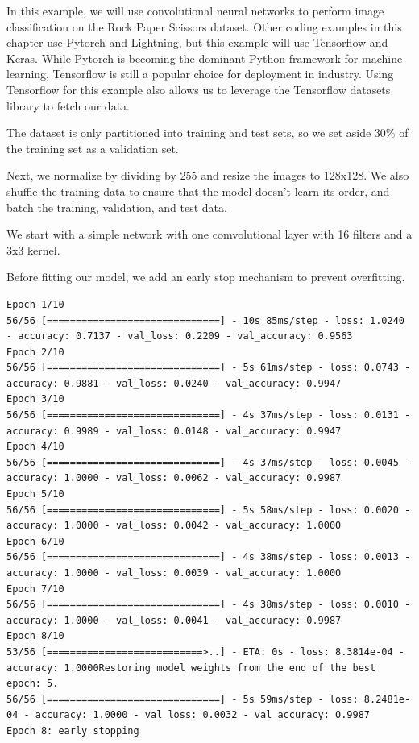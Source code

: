 \documentclass{article}
\begin{document}
In this example, we will use convolutional neural networks to perform image classification on the Rock Paper Scissors dataset. Other coding examples in this chapter use Pytorch and Lightning, but this example will use Tensorflow and Keras. While Pytorch is becoming the dominant Python framework for machine learning, Tensorflow is still a popular choice for deployment in industry. Using Tensorflow for this example also allows us to leverage the Tensorflow datasets library to fetch our data.



The dataset is only partitioned into training and test sets, so we set aside 30\% of the training set as a validation set.



Next, we normalize by dividing by 255 and resize the images to 128x128. We also shuffle the training data to ensure that the model doesn't learn its order, and batch the training, validation, and test data.



We start with a simple network with one comvolutional layer with 16 filters and a 3x3 kernel.



Before fitting our model, we add an early stop mechanism to prevent overfitting.



\begin{lstlisting}[style=output]
Epoch 1/10
56/56 [==============================] - 10s 85ms/step - loss: 1.0240 - accuracy: 0.7137 - val_loss: 0.2209 - val_accuracy: 0.9563
Epoch 2/10
56/56 [==============================] - 5s 61ms/step - loss: 0.0743 - accuracy: 0.9881 - val_loss: 0.0240 - val_accuracy: 0.9947
Epoch 3/10
56/56 [==============================] - 4s 37ms/step - loss: 0.0131 - accuracy: 0.9989 - val_loss: 0.0148 - val_accuracy: 0.9947
Epoch 4/10
56/56 [==============================] - 4s 37ms/step - loss: 0.0045 - accuracy: 1.0000 - val_loss: 0.0062 - val_accuracy: 0.9987
Epoch 5/10
56/56 [==============================] - 5s 58ms/step - loss: 0.0020 - accuracy: 1.0000 - val_loss: 0.0042 - val_accuracy: 1.0000
Epoch 6/10
56/56 [==============================] - 4s 38ms/step - loss: 0.0013 - accuracy: 1.0000 - val_loss: 0.0039 - val_accuracy: 1.0000
Epoch 7/10
56/56 [==============================] - 4s 38ms/step - loss: 0.0010 - accuracy: 1.0000 - val_loss: 0.0041 - val_accuracy: 0.9987
Epoch 8/10
53/56 [===========================>..] - ETA: 0s - loss: 8.3814e-04 - accuracy: 1.0000Restoring model weights from the end of the best epoch: 5.
56/56 [==============================] - 5s 59ms/step - loss: 8.2481e-04 - accuracy: 1.0000 - val_loss: 0.0032 - val_accuracy: 0.9987
Epoch 8: early stopping
\end{lstlisting}
\end{document}
